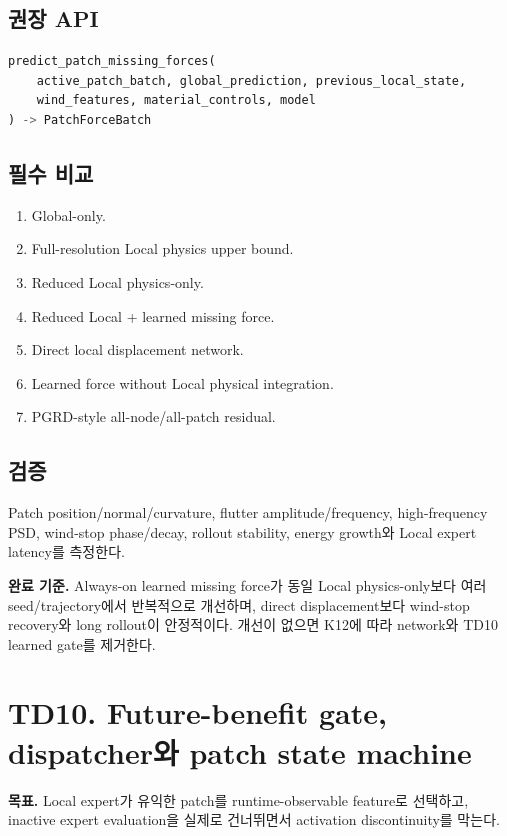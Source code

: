 \documentclass[10pt,a4paper]{article}
\begin{document}
\subsection*{권장 API}

\begin{lstlisting}[language=Python]
predict_patch_missing_forces(
    active_patch_batch, global_prediction, previous_local_state,
    wind_features, material_controls, model
) -> PatchForceBatch
\end{lstlisting}

\subsection*{필수 비교}

\begin{enumerate}
  \item Global-only.
  \item Full-resolution Local physics upper bound.
  \item Reduced Local physics-only.
  \item Reduced Local + learned missing force.
  \item Direct local displacement network.
  \item Learned force without Local physical integration.
  \item PGRD-style all-node/all-patch residual.
\end{enumerate}

\subsection*{검증}

Patch position/normal/curvature, flutter amplitude/frequency, high-frequency PSD,
wind-stop phase/decay, rollout stability, energy growth와 Local expert latency를 측정한다.

\textbf{완료 기준.}
Always-on learned missing force가 동일 Local physics-only보다 여러 seed/trajectory에서 반복적으로 개선하며,
direct displacement보다 wind-stop recovery와 long rollout이 안정적이다.
개선이 없으면 K12에 따라 network와 TD10 learned gate를 제거한다.

\section{TD10. Future-benefit gate, dispatcher와 patch state machine}

\textbf{목표.}
Local expert가 유익한 patch를 runtime-observable feature로 선택하고,
inactive expert evaluation을 실제로 건너뛰면서 activation discontinuity를 막는다.
\end{document}
